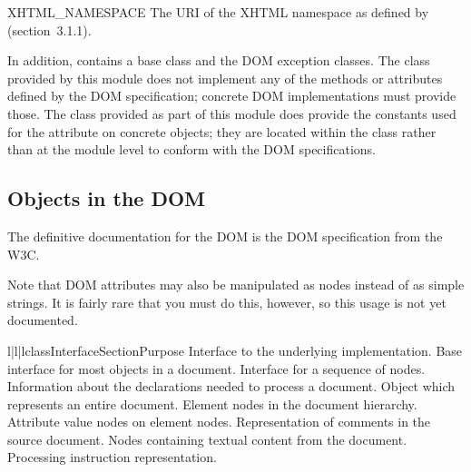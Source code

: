 \begin{datadesc}{XHTML_NAMESPACE}
  The URI of the XHTML namespace as defined by
   (section~3.1.1).
\end{datadesc}



In addition,  contains a base  class and
the DOM exception classes.  The  class provided by this
module does not implement any of the methods or attributes defined by
the DOM specification; concrete DOM implementations must provide
those.  The  class provided as part of this module does
provide the constants used for the  attribute on
concrete  objects; they are located within the class
rather than at the module level to conform with the DOM
specifications.


\subsection{Objects in the DOM \label{dom-objects}}

The definitive documentation for the DOM is the DOM specification from
the W3C.

Note that DOM attributes may also be manipulated as nodes instead of
as simple strings.  It is fairly rare that you must do this, however,
so this usage is not yet documented.


\begin{tableiii}{l|l|l}{class}{Interface}{Section}{Purpose}
          {Interface to the underlying implementation.}
          {Base interface for most objects in a document.}
          {Interface for a sequence of nodes.}
          {Information about the declarations needed to process a document.}
          {Object which represents an entire document.}
          {Element nodes in the document hierarchy.}
          {Attribute value nodes on element nodes.}
          {Representation of comments in the source document.}
          {Nodes containing textual content from the document.}
          {Processing instruction representation.}
\end{tableiii}

